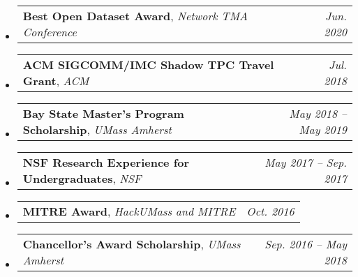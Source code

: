 \documentclass[letterpaper,11pt]{article}
\makeatletter
\newcommand{\ressubheadingNONITtwo}[4]{
\begin{tabular*}{6.5in}{l@{\cftdotfill{\cftsecdotsep}\extracolsep{\fill}}r}
		#1 & \textit{#4} \\
\end{tabular*}}
\makeatother
\begin{document}
\begin{itemize}[itemsep=-1mm]
\item \ressubheadingNONITtwo{\textbf{Best Open Dataset Award}, \textit{Network TMA Conference}}{}{}{Jun. 2020}
\item \ressubheadingNONITtwo{\textbf{ACM SIGCOMM/IMC Shadow TPC Travel Grant}, \textit{ACM}}{}{}{Jul. 2018}
\item \ressubheadingNONITtwo{\textbf{Bay State Master's Program Scholarship}, \textit{UMass Amherst}}{}{}{May 2018 -- May 2019}
\item \ressubheadingNONITtwo{\textbf{NSF Research Experience for Undergraduates}, \textit{NSF}}{}{}{May 2017 -- Sep. 2017}
\item \ressubheadingNONITtwo{\textbf{MITRE Award}, \textit{HackUMass and MITRE}}{}{}{Oct. 2016}
\item \ressubheadingNONITtwo{\textbf{Chancellor's Award Scholarship}, \textit{UMass Amherst}}{}{}{Sep. 2016 -- May 2018}
\end{itemize}
\end{document}

